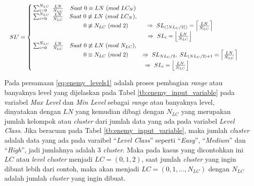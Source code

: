 \begin{equation}\label{eq:enemy_levels1}
\resizebox{\columnwidth}{!}{%
	$SL' = \left\{\begin{matrix}
	\hspace{0.2em} \sum_{i = 0}^{N_{LC}}\ \frac{LN}{N_{LC}} & Saat\ 0 \equiv LN\ (mod\ LC_{N}) & \\
	
	\hspace{0.2em} \sum_{i = 0}^{N_{LC}}\ \frac{LN}{N_{LC}} & Saat\ 0 \not\equiv LN\ (mod\ LC_{N}), & \\
	&\hspace{1.0em}  0 \not\equiv N_{LC}\ (mod\ 2) & \hspace{-3.5em} \Rightarrow\ SL_{(\left \lceil NL_{C}/2 \right \rceil)}  = \left \lceil \frac{LN}{N_{LC}} \right \rceil &\\
	
	& & \hspace{-7.0em} \Rightarrow\ SL_{i}  = \left \lfloor \frac{LN}{N_{LC}} \right \rfloor &\\
	
	\hspace{0.2em} \sum_{i = 0}^{N_{LC}}\ \frac{LN}{N_{LC}} & Saat\ 0 \not\equiv LN\ (mod\ N_{LC}), & \\
	&\hspace{1.0em}  0 \equiv N_{LC}\ (mod\ 2) & \Rightarrow\ SL_{NL_{C}/2},\ SL_{(NL_{C}/2) + 1}  = \left \lceil \frac{LN}{N_{LC}} \right \rceil &\\
	
	& & \hspace{-8.0em} \Rightarrow\ SL_{i}  = \left \lfloor \frac{LN}{N_{LC}} \right \rfloor &\\
	\end{matrix}\right.$%
}
\end{equation}

Pada persamaan \ref{eq:enemy_levels1} adalah proses pembagian \textit{range} atau banyaknya level yang dijelaskan pada Tabel \ref{tb:enemy_input_variable} pada variabel \textit{Max Level} dan \textit{Min Level} sebagai \textit{range} atau banyaknya level, dinyatakan dengan $LN$ yang kemudian dibagi dengan $N_{LC}$ yang merupakan jumlah kelompok atau \textit{cluster} dari jumlah data yang ada pada variabel \textit{Level Class}. Jika beracuan pada Tabel \ref{tb:enemy_input_variable}, maka jumlah \textit{cluster} adalah data yang ada pada varaibel ``\textit{Level Class}'' seperti ``\textit{Easy}'', ``\textit{Medium}'' dan ``\textit{High}'', jadi jumlahnya adalah 3 \textit{cluster}. Maka pada kasus yang dicontohkan ini $LC$ atau \textit{level cluster} menjadi $LC = \left (0, 1, 2 \right )$, saat jumlah \textit{cluster} yang ingin dibuat lebih dari contoh, maka akan menjadi $LC = \left (0, 1, ..., N_{LC} \right )$ dengan $N_{LC}$ adalah jumlah \textit{cluster} yang ingin dibuat.
\vspace{1ex}

